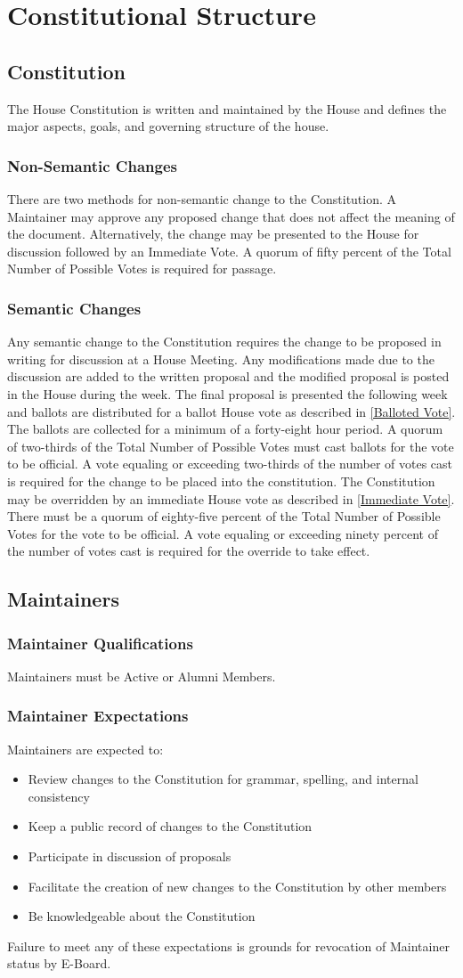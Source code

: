 \documentclass{article}
\newcommand{\article}[1]{\section{#1} \label{#1}}
\newcommand{\asection}[1]{\subsection{#1} \label{#1}}
\newcommand{\asubsection}[1]{\subsubsection{#1} \label{#1}}
\begin{document}
\article{Constitutional Structure}

\asection{Constitution}
The House Constitution is written and maintained by the House and defines the major aspects, goals, and governing structure of the house.

\asubsection{Non-Semantic Changes}
There are two methods for non-semantic change to the Constitution.
A Maintainer may approve any proposed change that does not affect the meaning of the document.
Alternatively, the change may be presented to the House for discussion followed by an Immediate Vote.
A quorum of fifty percent of the Total Number of Possible Votes is required for passage.

\asubsection{Semantic Changes}
Any semantic change to the Constitution requires the change to be proposed in writing for discussion at a House Meeting.
Any modifications made due to the discussion are added to the written proposal and the modified proposal is posted in the House during the week.
The final proposal is presented the following week and ballots are distributed for a ballot House vote as described in \ref{Balloted Vote}.
The ballots are collected for a minimum of a forty-eight hour period.
A quorum of two-thirds of the Total Number of Possible Votes must cast ballots for the vote to be official.
A vote equaling or exceeding two-thirds of the number of votes cast is required for the change to be placed into the constitution.
The Constitution may be overridden by an immediate House vote as described in \ref{Immediate Vote}.
There must be a quorum of eighty-five percent of the Total Number of Possible Votes for the vote to be official.
A vote equaling or exceeding ninety percent of the number of votes cast is required for the override to take effect.

\asection{Maintainers}

\asubsection{Maintainer Qualifications}
Maintainers must be Active or Alumni Members.

\asubsection{Maintainer Expectations}
Maintainers are expected to:
\begin{itemize}
	\item Review changes to the Constitution for grammar, spelling, and internal consistency
	\item Keep a public record of changes to the Constitution
	\item Participate in discussion of proposals
	\item Facilitate the creation of new changes to the Constitution by other members
	\item Be knowledgeable about the Constitution
\end{itemize}
Failure to meet any of these expectations is grounds for revocation of Maintainer status by E-Board.
\end{document}
